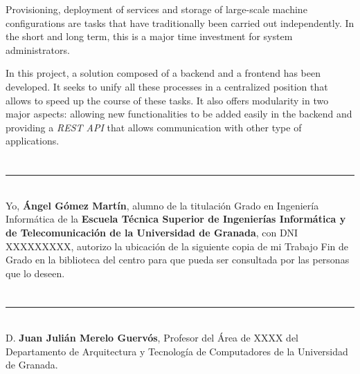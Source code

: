 Provisioning, deployment of services and storage of large-scale machine configurations are tasks that have traditionally been carried out independently. In the short and long term, this is a major time investment for system administrators.

\bigskip
In this project, a solution composed of a backend and a frontend has been developed. It seeks to unify all these processes in a centralized position that allows to speed up the course of these tasks. It also offers modularity in two major aspects: allowing new functionalities to be added easily in the backend and providing a \textit{REST API} that allows communication with other type of applications.











\chapter*{}
\thispagestyle{empty}

\noindent\rule[-1ex]{\textwidth}{2pt}\\[4.5ex]

Yo, \textbf{Ángel Gómez Martín}, alumno de la titulación Grado en Ingeniería Informática de la \textbf{Escuela Técnica Superior de Ingenierías Informática y de Telecomunicación de la Universidad de Granada}, con DNI XXXXXXXXX, autorizo la ubicación de la siguiente copia de mi Trabajo Fin de Grado en la biblioteca del centro para que pueda ser consultada por las personas que lo deseen.

\vspace{6cm}


\vspace{2cm}












\chapter*{}
\thispagestyle{empty}

\noindent\rule[-1ex]{\textwidth}{2pt}\\[4.5ex]

D. \textbf{Juan Julián Merelo Guervós}, Profesor del Área de XXXX del Departamento de Arquitectura y Tecnología de Computadores de la Universidad de Granada.

